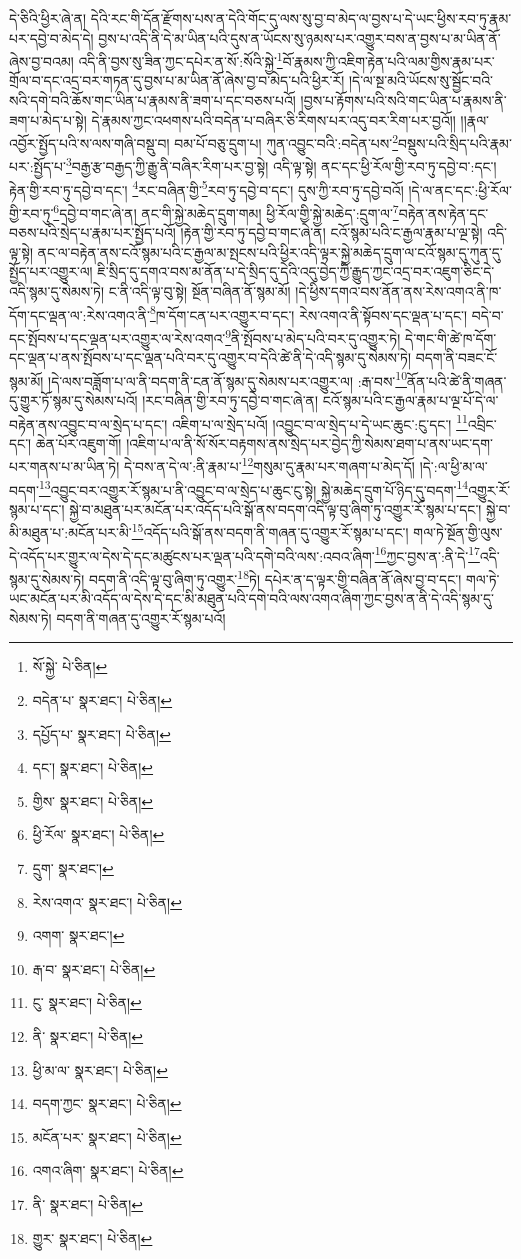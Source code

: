 དེ་ཅིའི་ཕྱིར་ཞེ་ན། དེའི་རང་གི་དོན་རྫོགས་པས་ན་དེའི་གོང་དུ་ལས་སུ་བྱ་བ་མེད་ལ་བྱས་པ་དེ་ཡང་ཕྱིས་རབ་ཏུ་རྣམ་པར་དབྱེ་བ་མེད་དེ། བྱས་པ་འདི་ནི་དེ་མ་ཡིན་པའི་དུས་ན་ཡོངས་སུ་ཉམས་པར་འགྱུར་བས་ན་བྱས་པ་མ་ཡིན་ནོ་ཞེས་བྱ་བའམ། འདི་ནི་བྱས་སུ་ཟིན་ཀྱང་དཔེར་ན་སོ་:སོའི་སྐྱེ་\footnote{སོ་སྐྱེ་  པེ་ཅིན། }བོ་རྣམས་ཀྱི་འཇིག་རྟེན་པའི་ལམ་གྱིས་རྣམ་པར་གྲོལ་བ་དང་འདྲ་བར་གཏན་དུ་བྱས་པ་མ་ཡིན་ནོ་ཞེས་བྱ་བ་མེད་པའི་ཕྱིར་རོ། །དེ་ལ་སྔ་མའི་ཡོངས་སུ་སྦྱོང་བའི་སའི་དགེ་བའི་ཆོས་གང་ཡིན་པ་རྣམས་ནི་ཟག་པ་དང་བཅས་པའོ། །བྱས་པ་རྟོགས་པའི་སའི་གང་ཡིན་པ་རྣམས་ནི་ཟག་པ་མེད་པ་སྟེ། དེ་རྣམས་ཀྱང་འཕགས་པའི་བདེན་པ་བཞིར་ཅི་རིགས་པར་འདུ་བར་རིག་པར་བྱའོ།། །།རྣལ་འབྱོར་སྤྱོད་པའི་ས་ལས་གཞི་བསྡུ་བ། བམ་པོ་བཅུ་དྲུག་པ། ཀུན་འབྱུང་བའི་:བདེན་པས་\footnote{བདེན་པ་  སྣར་ཐང་།  པེ་ཅིན། }བསྡུས་པའི་སྲིད་པའི་རྣམ་པར་:སྤྱོད་པ་\footnote{དཔྱོད་པ་  སྣར་ཐང་།  པེ་ཅིན། }བརྒྱ་རྩ་བརྒྱད་ཀྱི་རྒྱུ་ནི་བཞིར་རིག་པར་བྱ་སྟེ། འདི་ལྟ་སྟེ། ནང་དང་ཕྱི་རོལ་གྱི་རབ་ཏུ་དབྱེ་བ་:དང་། རྟེན་གྱི་རབ་ཏུ་དབྱེ་བ་དང་། \footnote{དང་།    སྣར་ཐང་།  པེ་ཅིན། }རང་བཞིན་གྱི་\footnote{གྱིས་  སྣར་ཐང་།  པེ་ཅིན། }རབ་ཏུ་དབྱེ་བ་དང་། དུས་ཀྱི་རབ་ཏུ་དབྱེ་བའོ། །དེ་ལ་ནང་དང་:ཕྱི་རོལ་གྱི་རབ་ཏུ་\footnote{ཕྱི་རོལ་  སྣར་ཐང་།  པེ་ཅིན། }དབྱེ་བ་གང་ཞེ་ན། ནང་གི་སྐྱེ་མཆེད་དྲུག་གམ། ཕྱི་རོལ་གྱི་སྐྱེ་མཆེད་:དྲུག་ལ་\footnote{དྲུག་  སྣར་ཐང་། }བརྟེན་ནས་རྟེན་དང་བཅས་པའི་སྲེད་པ་རྣམ་པར་སྤྱོད་པའོ། །རྟེན་གྱི་རབ་ཏུ་དབྱེ་བ་གང་ཞེ་ན། ངའོ་སྙམ་པའི་ང་རྒྱལ་རྣམ་པ་ལྔ་སྟེ། འདི་ལྟ་སྟེ། ནང་ལ་བརྟེན་ནས་ངའོ་སྙམ་པའི་ང་རྒྱལ་མ་སྤངས་པའི་ཕྱིར་འདི་ལྟར་སྐྱེ་མཆེད་དྲུག་ལ་ངའོ་སྙམ་དུ་ཀུན་དུ་སྤྱོད་པར་འགྱུར་ལ། ཇི་སྲིད་དུ་དགའ་བས་མ་ནོན་པ་དེ་སྲིད་དུ་དེའི་འདུ་བྱེད་ཀྱི་རྒྱུད་ཀྱང་འདྲ་བར་འཇུག་ཅིང་དེ་འདི་སྙམ་དུ་སེམས་ཏེ། ང་ནི་འདི་ལྟ་བུ་སྟེ། སྔོན་བཞིན་ནོ་སྙམ་མོ། །དེ་ཕྱིས་དགའ་བས་ནོན་ནས་རེས་འགའ་ནི་ཁ་དོག་དང་ལྡན་ལ་:རེས་འགའ་ནི་\footnote{རེས་འགའ་  སྣར་ཐང་།  པེ་ཅིན། }ཁ་དོག་ངན་པར་འགྱུར་བ་དང་། རེས་འགའ་ནི་སྟོབས་དང་ལྡན་པ་དང་། བདེ་བ་དང་སྤོབས་པ་དང་ལྡན་པར་འགྱུར་ལ་རེས་འགའ་\footnote{འགག་  སྣར་ཐང་། }ནི་སྤོབས་པ་མེད་པའི་བར་དུ་འགྱུར་ཏེ། དེ་གང་གི་ཚེ་ཁ་དོག་དང་ལྡན་པ་ནས་སྤོབས་པ་དང་ལྡན་པའི་བར་དུ་འགྱུར་བ་དེའི་ཚེ་ནི་དེ་འདི་སྙམ་དུ་སེམས་ཏེ། བདག་ནི་བཟང་ངོ་སྙམ་མོ། །དེ་ལས་བཟློག་པ་ལ་ནི་བདག་ནི་ངན་ནོ་སྙམ་དུ་སེམས་པར་འགྱུར་ལ། :རྒ་བས་\footnote{རྒ་བ་  སྣར་ཐང་།  པེ་ཅིན། }ནོན་པའི་ཚེ་ནི་གཞན་དུ་གྱུར་ཏོ་སྙམ་དུ་སེམས་པའོ། །རང་བཞིན་གྱི་རབ་ཏུ་དབྱེ་བ་གང་ཞེ་ན། ངའོ་སྙམ་པའི་ང་རྒྱལ་རྣམ་པ་ལྔ་པོ་དེ་ལ་བརྟེན་ནས་འབྱུང་བ་ལ་སྲེད་པ་དང་། འཇིག་པ་ལ་སྲེད་པའོ། །འབྱུང་བ་ལ་སྲེད་པ་དེ་ཡང་ཆུང་:ངུ་དང་། \footnote{ངུ་  སྣར་ཐང་།  པེ་ཅིན། }འབྲིང་དང་། ཆེན་པོར་འཇུག་གོ། །འཇིག་པ་ལ་ནི་སོ་སོར་བརྟགས་ནས་སྲེད་པར་བྱེད་ཀྱི་སེམས་ཐག་པ་ནས་ཡང་དག་པར་གནས་པ་མ་ཡིན་ཏེ། དེ་བས་ན་དེ་ལ་:ནི་རྣམ་པ་\footnote{ནི་  སྣར་ཐང་།  པེ་ཅིན། }གསུམ་དུ་རྣམ་པར་གཞག་པ་མེད་དོ། །དེ་:ལ་ཕྱི་མ་ལ་བདག་\footnote{ཕྱི་མ་ལ་  སྣར་ཐང་།  པེ་ཅིན། }འབྱུང་བར་འགྱུར་རོ་སྙམ་པ་ནི་འབྱུང་བ་ལ་སྲེད་པ་ཆུང་ངུ་སྟེ། སྐྱེ་མཆེད་དྲུག་པོ་ཉིད་དུ་བདག་\footnote{བདག་ཀྱང་  སྣར་ཐང་།  པེ་ཅིན། }འགྱུར་རོ་སྙམ་པ་དང་། སྐྱེ་བ་མཐུན་པར་མངོན་པར་འདོད་པའི་སྒོ་ནས་བདག་འདི་ལྟ་བུ་ཞིག་ཏུ་འགྱུར་རོ་སྙམ་པ་དང་། སྐྱེ་བ་མི་མཐུན་པ་:མངོན་པར་མི་\footnote{མངོན་པར་  སྣར་ཐང་།  པེ་ཅིན། }འདོད་པའི་སྒོ་ནས་བདག་ནི་གཞན་དུ་འགྱུར་རོ་སྙམ་པ་དང་། གལ་ཏེ་སྔོན་གྱི་ལུས་དེ་འདོད་པར་གྱུར་ལ་དེས་དེ་དང་མཚུངས་པར་ལྡན་པའི་དགེ་བའི་ལས་:འབའ་ཞིག་\footnote{འགའ་ཞིག་  སྣར་ཐང་།  པེ་ཅིན། }ཀྱང་བྱས་ན་:ནི་དེ་\footnote{ནི་  སྣར་ཐང་།  པེ་ཅིན། }འདི་སྙམ་དུ་སེམས་ཏེ། བདག་ནི་འདི་ལྟ་བུ་ཞིག་ཏུ་འགྱུར་\footnote{གྱུར་  སྣར་ཐང་།  པེ་ཅིན། }ཏེ། དཔེར་ན་ད་ལྟར་གྱི་བཞིན་ནོ་ཞེས་བྱ་བ་དང་། གལ་ཏེ་ཡང་མངོན་པར་མི་འདོད་ལ་དེས་དེ་དང་མི་མཐུན་པའི་དགེ་བའི་ལས་འགའ་ཞིག་ཀྱང་བྱས་ན་ནི་དེ་འདི་སྙམ་དུ་སེམས་ཏེ། བདག་ནི་གཞན་དུ་འགྱུར་རོ་སྙམ་པའོ། 